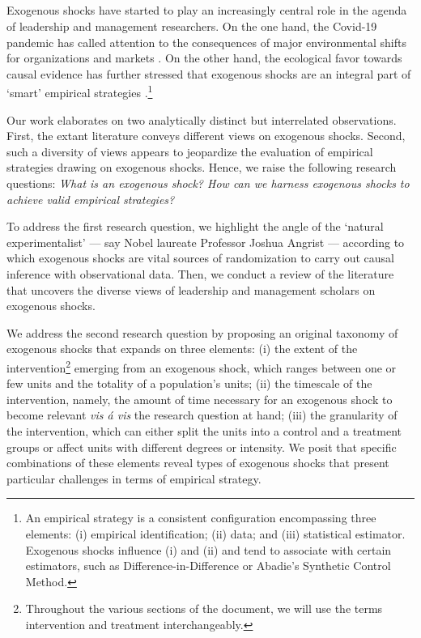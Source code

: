 \documentclass[11pt]{article}
\begin{document}
\begin{refsection}

\section{}
\label{sec:introduction}

\noindent Exogenous shocks have started to play an increasingly central role in
the agenda of leadership and management researchers. On the one hand, the
Covid-19 pandemic has called attention to the consequences of major
environmental shifts for organizations \autocite{kniffin_et_al_2021} and markets
\autocite{zhang_et_al_2020}.  On the other hand, the ecological favor towards
causal evidence has further stressed that exogenous shocks are an integral part
of `smart' empirical strategies \autocite{angrist_2022}.\footnote{An empirical
strategy is a consistent configuration encompassing three elements: (i)
empirical identification; (ii) data; and (iii) statistical estimator. Exogenous
shocks influence (i) and (ii) and tend to associate with certain estimators,
such as Difference-in-Difference or Abadie's Synthetic Control Method.}

Our work elaborates on two analytically distinct but interrelated observations.
First, the extant literature conveys different views on exogenous
shocks. Second, such a diversity of views appears to jeopardize the evaluation of
empirical strategies drawing on exogenous shocks.  Hence, we raise the following
research questions: \textit{What is an exogenous shock? How can we harness
exogenous shocks to achieve valid empirical strategies?}  

To address the first research question, we highlight the angle of the
`natural experimentalist' --- say Nobel laureate Professor Joshua Angrist --- 
according to which exogenous shocks are vital sources of randomization to carry
out causal inference with observational data.  Then, we conduct a
review of the literature that uncovers the diverse views of leadership and
management scholars on exogenous shocks. 

We address the second research question by proposing an original taxonomy of
exogenous shocks that expands on three elements: (i) the extent of the
intervention\footnote{Throughout the various sections of the document,
we will use the terms intervention and treatment interchangeably.} emerging  
from an exogenous shock, which ranges between one or few units and the totality
of a population's units; (ii) the timescale of the intervention, namely, 
the amount of time necessary for an exogenous shock to become relevant 
\textit{vis \'a vis} the research question at hand; (iii) the granularity 
of the intervention, which can either split the units into a control and a 
treatment groups or affect units with different degrees or intensity. 
We posit that specific combinations of these elements reveal types 
of exogenous shocks that present particular challenges in terms of 
empirical strategy.


\end{refsection}
\end{document}
